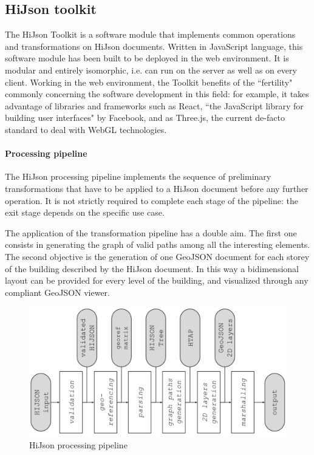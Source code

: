 \documentclass{sig-alternate}
\begin{document}
\subsection{HiJson toolkit}

The HiJson Toolkit is a software module that implements common operations and transformations on HiJson documents. Written in JavaScript language, this software module has been built to be deployed in the web environment. It is modular and entirely isomorphic, i.e. can run on the server as well as on every client. Working in the web environment, the Toolkit benefits of the ``fertility" commonly concerning the software development in this field: for example, it takes advantage of libraries and frameworks such as React, ``the JavaScript library for building user interfaces" by Facebook, and as Three.js, the current de-facto standard to deal with WebGL technologies.

\paragraph{Processing pipeline} 
The HiJson processing pipeline implements the sequence of preliminary transformations that have to be applied to a HiJson document before any further operation. It is not strictly required to complete each stage of the pipeline: the exit stage depends on the specific use case.

The application of the transformation pipeline has a double aim. The first one consists in generating the graph of valid paths among all the interesting elements. The second objective is the generation of one GeoJSON document for each storey of the building described by the HiJson document. In this way a bidimensional layout can be provided for every level of the building, and visualized through any compliant GeoJSON viewer.

\begin{figure}[!htbp]
\centering
\includegraphics[width=.8\linewidth]{../images/pipeline-2}
\caption{HiJson processing pipeline}
\label{fig:pipeline}
\end{figure}
\end{document}
